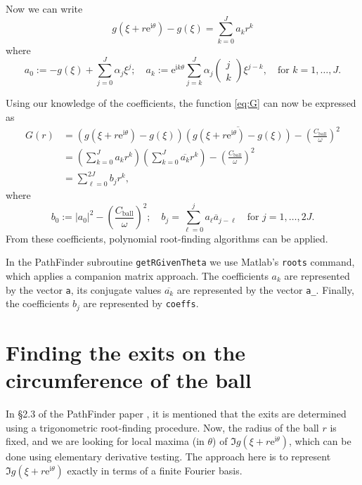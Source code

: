 \documentclass[12pt]{article}
\newcommand{\re}{\mathrm{e}}
\newcommand{\ri}{\mathrm{i}}
\newcommand{\Cball}{C_{\mathrm{ball}}}
\begin{document}
Now we can write
\[
g(\xi+r\re^{\ri \theta})-g(\xi) = \sum_{k=0}^J a_kr^k
\]
where
\[
a_0 := -g(\xi)+\sum_{j=0}^J \alpha_j
\xi^{j};\quad
a_k := \re^{\ri k \theta}\sum_{j=k}^J \alpha_j\left(\begin{array}{c}
	j\\k
\end{array}\right)
\xi^{j-k},\quad\text{for }k=1,\ldots,J.
\]

Using our knowledge of the coefficients, the function \eqref{eq:G} can now be expressed as
\begin{align*}
G(r)&=\left(g(\xi+r\re^{\ri \theta})-g(\xi)\right)\overline{\left(g(\xi+r\re^{\ri \theta})-g(\xi)\right)}-\left(\frac{\Cball}{\omega}\right)^2\\
&=\left(\sum_{k=0}^J a_kr^k\right)\left(\sum_{k=0}^J \overline{a_k}r^k\right) -\left(\frac{\Cball}{\omega}\right)^2\\
&=\sum_{\ell=0}^{2J} b_jr^k,
\end{align*}
where
\[
b_0 := |a_0|^2 -\left(\frac{\Cball}{\omega}\right)^2; \quad b_j=\sum_{\ell=0}^{j}a_\ell\overline{a}_{j-\ell}\quad\text{for }j=1,\ldots,2J.
\]
From these coefficients, polynomial root-finding algorithms can be applied.

In the PathFinder subroutine \texttt{getRGivenTheta} we use Matlab's \texttt{roots} command, which applies a companion matrix approach. The coefficients $a_k$ are represented by the vector \texttt{a}, its conjugate values $\overline{a_k}$ are represented by the vector \texttt{a\_}. Finally, the coefficients $b_j$ are represented by \texttt{coeffs}.

\section{Finding the exits on the circumference of the ball}

In \S2.3 of the PathFinder paper \cite{PFpaper}, it is mentioned that the exits are determined using a trigonometric root-finding procedure. Now, the radius of the ball $r$ is fixed, and we are looking for local maxima (in $\theta$) of $\Im g(\xi+r\re^{\ri \theta})$, which can be done using elementary derivative testing. The approach here is to represent $\Im g(\xi+r\re^{\ri \theta})$ exactly in terms of a finite Fourier basis.
\end{document}
